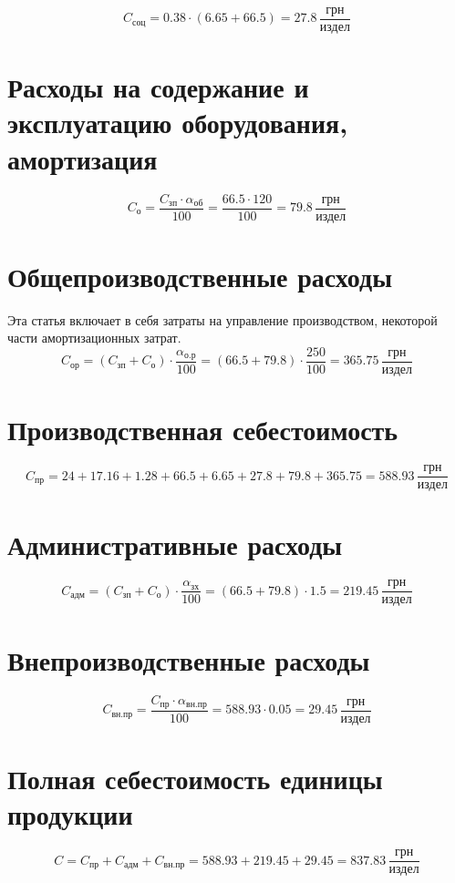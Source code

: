 \documentclass[a4paper,10pt,notitlepage,pdftex,headsepline]{scrartcl}
\begin{document}
  \begin{equation}
    C_\text{соц} = 0.38 \cdot \left( 6.65 + 66.5 \right) =
    27.8\,\frac{\text{грн}}{\text{издел}}
    \label{eq:r6}
  \end{equation}
\section{Расходы на содержание и эксплуатацию оборудования, амортизация}
  \begin{equation}
    C_\text{о} = \frac{C_\text{зп} \cdot \alpha_\text{об}}{100} =
    \frac{66.5 \cdot 120}{100} = 79.8\,\frac{\text{грн}}{\text{издел}}
    \label{eq:r7}
  \end{equation}
\section{Общепроизводственные расходы}
  Эта статья включает в себя затраты на управление производством, некоторой
  части амортизационных затрат.
  \begin{equation}
    C_\text{ор} = \left( C_\text{зп} + C_\text{о} \right) \cdot
    \frac{\alpha_\text{о.р}}{100} = \left( 66.5 + 79.8 \right) \cdot
    \frac{250}{100} = 365.75\,\frac{\text{грн}}{\text{издел}}
    \label{eq:r8}
  \end{equation}
\section{Производственная себестоимость}
  \begin{equation}
    C_\text{пр} = 24 + 17.16 + 1.28 + 66.5 + 6.65 + 27.8 + 79.8 + 365.75 =
    588.93\,\frac{\text{грн}}{\text{издел}}
    \label{eq:r9}
  \end{equation}
\section{Административные расходы}
  \begin{equation}
    C_\text{адм} = \left( C_\text{зп} + C_\text{о}
    \right)\cdot\frac{\alpha_\text{зх}}{100} = \left( 66.5 + 79.8 \right)
    \cdot 1.5 = 219.45\,\frac{\text{грн}}{\text{издел}}
    \label{eq:r10}
  \end{equation}
\section{Внепроизводственные расходы}
  \begin{equation}
    C_\text{вн.пр} = \frac{C_\text{пр}\cdot\alpha_\text{вн.пр}}{100} = 588.93
    \cdot 0.05 = 29.45\,\frac{\text{грн}}{\text{издел}}
    \label{eq:r11}
  \end{equation}
\section{Полная себестоимость единицы продукции}
  \begin{equation}
    C = C_\text{пр} + C_\text{адм} + C_\text{вн.пр} = 588.93 + 219.45 + 29.45
    = 837.83\,\frac{\text{грн}}{\text{издел}}
    \label{eq:r12}
  \end{equation}
\end{document}
